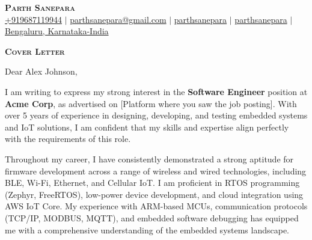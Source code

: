 \documentclass[letterpaper,11pt]{article}
\newcommand{\CompanyName}{Acme Corp}
\newcommand{\Position}{Software Engineer}
\newcommand{\HiringManager}{Alex Johnson}
\begin{document}
\vspace{2cm}

\begin{center}
    \textbf{\Huge \scshape Parth Sanepara} \\ \vspace{3pt}
    \small
    \faMobile \hspace{.5pt} \href{tel:9687119944}{+919687119944}
    $|$
    \faAt \hspace{.5pt} \href{mailto:parthsanepara@gmail.com}{parthsanepara@gmail.com}
    $|$
    \faLinkedinSquare \hspace{.5pt} \href{https://www.linkedin.com/in/parthsanepara}{parthsanepara}
    $|$
    \faGithub \hspace{.5pt} \href{https://github.com/parthsanepara}{parthsanepara}
    $|$
    \faMapMarker \hspace{.5pt} \href{https://maps.app.goo.gl/cc5ibm6jAiXmRFp17}{Bengaluru, Karnataka-India}
\end{center}

\vspace{2cm}

\begin{center}
    \textbf{\Large \scshape Cover Letter} \\ \vspace{3pt}
\end{center}

\vspace{1cm}

  Dear \HiringManager{},\\ \vspace{3pt}

  I am writing to express my strong interest in the \textbf{\Position{}} position at \textbf{\CompanyName{}}, 
  as advertised on [Platform where you saw the job posting]. With over 5 years of experience in designing, developing,
  and testing embedded systems and IoT solutions, I am confident that my skills and expertise align perfectly with the 
  requirements of this role. \\ \vspace{3pt}

  Throughout my career, I have consistently demonstrated a strong aptitude for firmware development across a range of 
  wireless and wired technologies, including BLE, Wi-Fi, Ethernet, and Cellular IoT. I am proficient in RTOS programming 
  (Zephyr, FreeRTOS), low-power device development, and cloud integration using AWS IoT Core. My experience with ARM-based MCUs, 
  communication protocols (TCP/IP, MODBUS, MQTT), and embedded software debugging has equipped me with a comprehensive 
  understanding of the embedded systems landscape. \\ \vspace{3pt}
\end{document}
